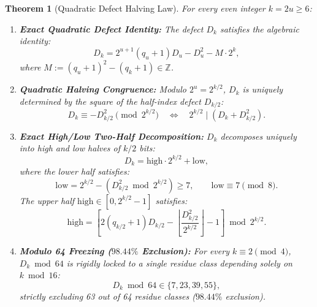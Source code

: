 \documentclass[11pt,reqno]{amsart}
\newtheorem{theorem}{Theorem}[section]
\theoremstyle{definition}
\numberwithin{equation}{section}
\begin{document}
\begin{theorem}[Quadratic Defect Halving Law]\label{thm:quadratic_halving}
For every even integer $k = 2u \ge 6$:
\begin{enumerate}
    \item \textbf{Exact Quadratic Defect Identity:} The defect $D_k$ satisfies the algebraic identity:
    \begin{equation}\label{eq:quadratic_defect_id}
    D_k = 2^{u+1}(q_u + 1) D_u - D_u^2 - M \cdot 2^k,
    \end{equation}
    where $M := (q_u + 1)^2 - (q_k + 1) \in \mathbb{Z}$.
    \item \textbf{Quadratic Halving Congruence:} Modulo $2^u = 2^{k/2}$, $D_k$ is uniquely determined by the square of the half-index defect $D_{k/2}$:
    \begin{equation}\label{eq:quadratic_halving_cong}
    D_k \equiv -D_{k/2}^2 \pmod{2^{k/2}} \quad \Longleftrightarrow \quad 2^{k/2} \mid (D_k + D_{k/2}^2).
    \end{equation}
    \item \textbf{Exact High/Low Two-Half Decomposition:}
    $D_k$ decomposes uniquely into high and low halves of $k/2$ bits:
    \begin{equation}\label{eq:high_low_decomp}
    D_k = \mathrm{high} \cdot 2^{k/2} + \mathrm{low},
    \end{equation}
    where the lower half satisfies:
    \begin{equation}\label{eq:low_half_floor}
    \mathrm{low} = 2^{k/2} - (D_{k/2}^2 \bmod 2^{k/2}) \ge 7, \qquad \mathrm{low} \equiv 7 \pmod 8.
    \end{equation}
    The upper half $\mathrm{high} \in [0, 2^{k/2}-1]$ satisfies:
    \begin{equation}\label{eq:high_half_formula}
    \mathrm{high} = \left[ 2(q_{k/2}+1) D_{k/2} - \left\lfloor \frac{D_{k/2}^2}{2^{k/2}} \right\rfloor - 1 \right] \bmod 2^{k/2}.
    \end{equation}
    \item \textbf{Modulo 64 Freezing ($98.44\%$ Exclusion):}
    For every $k \equiv 2 \pmod 4$, $D_k \bmod 64$ is rigidly locked to a single residue class depending solely on $k \bmod 16$:
    \begin{equation}\label{eq:mod64_freezing}
    D_k \bmod 64 \in \{7, 23, 39, 55\},
    \end{equation}
    strictly excluding 63 out of 64 residue classes ($98.44\%$ exclusion).
\end{enumerate}
\end{theorem}
\end{document}
